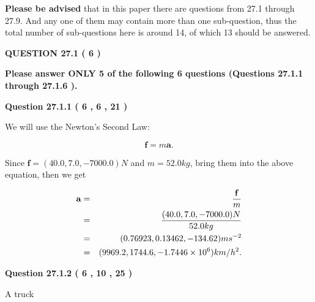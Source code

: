 \documentclass[12pt]{article}
\begin{document}
{\textbf{\large{Please be advised}}} that in this paper there are questions from
27.1 through
27.9.
And any one of them may contain more than one sub-question, thus the total number
of sub-questions here is around 14, of which
13 should be answered.
 
\vspace{0.3in}
 
 
   
   
  
\vspace{0.2in}
  
{\textbf{\Large{QUESTION
27.1 
 (           6 )
}}}
  
  
{\textbf{\Large{Please answer ONLY  %
           5  %
 of the following  %
           6  %
 questions (Questions  %
27.1.1 %
 through  %
27.1.6 %
 ). }}}
   
   
  
\vspace{0.2in}
  
{\textbf{\Large{Question
27.1.1 
 (           6 ,           6 ,          21 )
}}}
  
  
 
 
\noindent{}

We will use the Newton's Second Law:
 
\[
\mathbf{f}=m\mathbf{a}.
\]
 
Since $\mathbf{f}=( %
40.0,  %
7.0,  %
-7000.0 )N$
and $m= %
52.0 kg$, bring them into the above equation, then we get
 
\begin{eqnarray*}
\mathbf{a}&=&\frac{\mathbf{f}}m  \\
&=&\frac{(
40.0 ,
7.0 ,
-7000.0 )N
}{ %
52.0 kg}  \\
&=&(
0.76923 ,
0.13462,
-134.62
)ms^{-2} \\
&=&(
9969.2 ,
1744.6 ,
-1.7446 \times 10^{6}
)km/h^2.
\end{eqnarray*}
 
 
 
  
\vspace{0.2in}
  
{\textbf{\Large{Question
27.1.2 
 (           6 ,          10 ,          25 )
}}}
  
  
 
 
\noindent{}
 
 
A truck
 
\end{document}
